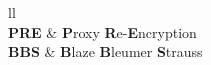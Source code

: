
\begin{abbreviations}{ll} %
\addchaptertocentry{\abbrevname}\\

\textbf{PRE} & \textbf{P}roxy \textbf{R}e-\textbf{E}ncryption\\
\textbf{BBS} & \textbf{B}laze \textbf{B}leumer \textbf{S}trauss\\

\end{abbreviations}

